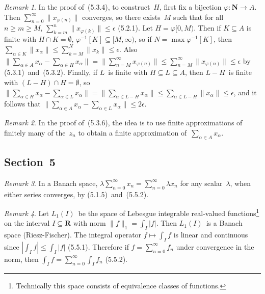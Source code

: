 \documentclass[letterpaper,12pt]{article}
\newcommand{\N}{\mathbf{N}}
\newcommand{\R}{\mathbf{R}}
\newcommand{\sect}{\cap}
\newcommand{\inv}[1]{#1^{-1}}
\newcommand{\abs}[1]{|{#1}|}
\newcommand{\norm}[1]{\lVert{#1}\rVert}
\theoremstyle{plain}
\theoremstyle{definition}
\theoremstyle{remark}
\newtheorem*{rmk}{Remark}
\begin{document}
\begin{rmk}
In the proof of~(5.3.4), to construct~\(H\), first fix a bijection \(\varphi:\N\to A\). Then \(\sum_{n=0}^{\infty}\norm{x_{\varphi(n)}}\) converges, so there exists~\(M\) such that for all \(n\ge m\ge M\), \(\sum_{k=m}^n\norm{x_{\varphi(k)}}\le\epsilon\) (5.2.1). Let \(H=\varphi[0,M)\). Then if \(K\subseteq A\) is finite with \(H\sect K=\emptyset\), \(\inv{\varphi}[K]\subseteq[M,\infty)\), so if \(N=\max\inv{\varphi}[K]\), then \(\sum_{\alpha\in K}\norm{x_{\alpha}}\le\sum_{k=M}^N\norm{x_k}\le\epsilon\). Also \(\norm{\sum_{\alpha\in A}x_{\alpha}-\sum_{\alpha\in H}x_{\alpha}}=\norm{\sum_{n=M}^{\infty}x_{\varphi(n)}}\le\sum_{n=M}^{\infty}\norm{x_{\varphi(n)}}\le\epsilon\) by (5.3.1)~and~(5.3.2). Finally, if \(L\)~is finite with \(H\subseteq L\subseteq A\), then \(L-H\)~is finite with \((L-H)\sect H=\emptyset\), so \(\norm{\sum_{\alpha\in H}x_{\alpha}-\sum_{\alpha\in L}x_{\alpha}}=\norm{\sum_{\alpha\in L-H}x_{\alpha}}\le\sum_{\alpha\in L-H}\norm{x_{\alpha}}\le\epsilon\), and it follows that \(\norm{\sum_{\alpha\in A}x_{\alpha}-\sum_{\alpha\in L}x_{\alpha}}\le 2\epsilon\).
\end{rmk}

\begin{rmk}
In the proof of~(5.3.6), the idea is to use finite approximations of finitely many of the~\(z_n\) to obtain a finite approximation of~\(\sum_{\alpha\in A}x_\alpha\).
\end{rmk}

\subsection*{Section~5}
\begin{rmk}
In a Banach space, \(\lambda\sum_{n=0}^{\infty}x_n=\sum_{n=0}^{\infty}\lambda x_n\) for any scalar~\(\lambda\), when either series converges, by (5.1.5)~and~(5.5.2).
\end{rmk}

\begin{rmk}
Let \(L_1(I)\)~be the space of Lebesgue integrable real-valued functions\footnote{Technically this space consists of equivalence classes of functions.} on the interval \(I\subseteq\R\) with norm \(\norm{f}_1=\int_I\abs{f}\). Then \(L_1(I)\)~is a Banach space (Riesz-Fischer). The integral operator \(f\mapsto\int_If\) is linear and continuous since \(\abs{\int_If}\le\int_I\abs{f}\) (5.5.1). Therefore if \(f=\sum_{n=0}^{\infty}f_n\) under convergence in the norm, then \(\int_I f=\sum_{n=0}^{\infty}\int_I f_n\) (5.5.2).
\end{rmk}
\end{document}
